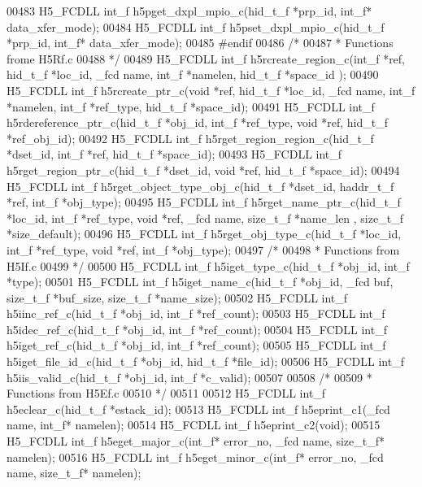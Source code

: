 \begin{DoxyCode}
00483 H5\_FCDLL int\_f h5pget\_dxpl\_mpio\_c(hid\_t\_f *prp\_id, int\_f* data\_xfer\_mode);
00484 H5\_FCDLL int\_f h5pset\_dxpl\_mpio\_c(hid\_t\_f *prp\_id, int\_f* data\_xfer\_mode);
00485 \textcolor{preprocessor}{#endif}
00486 \textcolor{comment}{/*}
00487 \textcolor{comment}{ * Functions frome H5Rf.c}
00488 \textcolor{comment}{ */}
00489 H5\_FCDLL int\_f h5rcreate\_region\_c(int\_f *ref, hid\_t\_f *loc\_id, \_fcd name, int\_f *namelen, hid\_t\_f *space\_id
      );
00490 H5\_FCDLL int\_f h5rcreate\_ptr\_c(\textcolor{keywordtype}{void} *ref, hid\_t\_f *loc\_id, \_fcd name, int\_f *namelen, int\_f *ref\_type, 
      hid\_t\_f *space\_id);
00491 H5\_FCDLL int\_f h5rdereference\_ptr\_c(hid\_t\_f *obj\_id, int\_f *ref\_type, \textcolor{keywordtype}{void} *ref, hid\_t\_f *ref\_obj\_id);
00492 H5\_FCDLL int\_f h5rget\_region\_region\_c(hid\_t\_f *dset\_id, int\_f *ref, hid\_t\_f *space\_id);
00493 H5\_FCDLL int\_f h5rget\_region\_ptr\_c(hid\_t\_f *dset\_id, \textcolor{keywordtype}{void} *ref, hid\_t\_f *space\_id);
00494 H5\_FCDLL int\_f h5rget\_object\_type\_obj\_c(hid\_t\_f *dset\_id, haddr\_t\_f *ref, int\_f *obj\_type);
00495 H5\_FCDLL int\_f h5rget\_name\_ptr\_c(hid\_t\_f *loc\_id, int\_f *ref\_type, \textcolor{keywordtype}{void} *ref, \_fcd name, size\_t\_f *name\_len
      , size\_t\_f *size\_default);
00496 H5\_FCDLL int\_f h5rget\_obj\_type\_c(hid\_t\_f *loc\_id, int\_f *ref\_type, \textcolor{keywordtype}{void} *ref, int\_f *obj\_type);
00497 \textcolor{comment}{/*}
00498 \textcolor{comment}{ * Functions from H5If.c}
00499 \textcolor{comment}{ */}
00500 H5\_FCDLL int\_f h5iget\_type\_c(hid\_t\_f *obj\_id, int\_f *type);
00501 H5\_FCDLL int\_f h5iget\_name\_c(hid\_t\_f *obj\_id, \_fcd buf, size\_t\_f *buf\_size, size\_t\_f *name\_size);
00502 H5\_FCDLL int\_f h5iinc\_ref\_c(hid\_t\_f *obj\_id, int\_f *ref\_count);
00503 H5\_FCDLL int\_f h5idec\_ref\_c(hid\_t\_f *obj\_id, int\_f *ref\_count);
00504 H5\_FCDLL int\_f h5iget\_ref\_c(hid\_t\_f *obj\_id, int\_f *ref\_count);
00505 H5\_FCDLL int\_f h5iget\_file\_id\_c(hid\_t\_f *obj\_id, hid\_t\_f *file\_id);
00506 H5\_FCDLL int\_f h5iis\_valid\_c(hid\_t\_f *obj\_id, int\_f *c\_valid);
00507 
00508 \textcolor{comment}{/*}
00509 \textcolor{comment}{ * Functions from H5Ef.c}
00510 \textcolor{comment}{ */}
00511 
00512 H5\_FCDLL int\_f h5eclear\_c(hid\_t\_f *estack\_id);
00513 H5\_FCDLL int\_f h5eprint\_c1(\_fcd name, int\_f* namelen);
00514 H5\_FCDLL int\_f h5eprint\_c2(\textcolor{keywordtype}{void});
00515 H5\_FCDLL int\_f h5eget\_major\_c(int\_f* error\_no, \_fcd name, size\_t\_f* namelen);
00516 H5\_FCDLL int\_f h5eget\_minor\_c(int\_f* error\_no, \_fcd name, size\_t\_f* namelen);

\end{DoxyCode}
